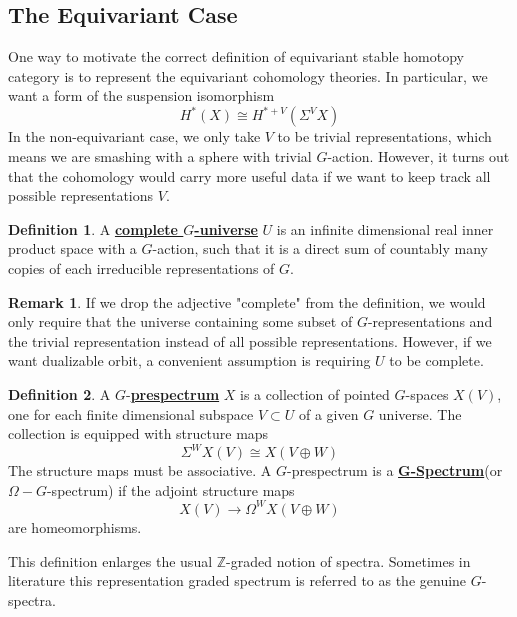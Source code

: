 \documentclass{article}
\theoremstyle{definition}
\theoremstyle{definition}
\newtheorem{definition}{Definition}[theorem]
\theoremstyle{definition}
\newtheorem{remark}{Remark}[theorem]
\theoremstyle{definition}
\theoremstyle{definition}
\theoremstyle{definition}
\theoremstyle{definition}
\begin{document}
\subsection{The Equivariant Case}
One way to motivate the correct definition of equivariant stable homotopy category is to represent the equivariant cohomology theories. In particular, we want a form of the suspension isomorphism
\[H^*(X)\cong H^{*+V}(\Sigma^VX)\]
In the non-equivariant case, we only take $V$ to be trivial representations, which means we are smashing with a sphere with trivial $G$-action. However, it turns out that the cohomology would carry more useful data if we want to keep track all possible representations $V$. 


\begin{tcolorbox}[colback=purple!5!white,colframe=purple!75!black]
\begin{definition}
A \underline{\textbf{complete $G$-universe}} $U$ is an infinite dimensional real inner product space with a $G$-action, such that it is a direct sum of countably many copies of each irreducible representations of $G$. 
\end{definition}
\end{tcolorbox}


\begin{tcolorbox}[colback=green!5!white,colframe=green!30!white]
\begin{remark}
If we drop the adjective "complete" from the definition, we would only require that the universe containing some subset of $G$-representations and the trivial representation instead of all possible representations. However, if we want dualizable orbit, a convenient assumption is requiring $U$ to be complete.  
\end{remark}
\end{tcolorbox}


\begin{tcolorbox}[colback=purple!5!white,colframe=purple!75!black]
\begin{definition}
A $G$-\underline{\textbf{prespectrum}} $X$ is a collection of pointed $G$-spaces $X(V)$, one for each finite dimensional subspace $V\subset U$ of a given $G$ universe. The collection is equipped with structure maps 
\[\Sigma^WX(V)\cong X(V\oplus W)\]
The structure maps must be associative. A $G$-prespectrum is a \underline{\textbf{G-Spectrum}}(or $\Omega-G$-spectrum) if the adjoint structure maps 
\[X(V)\to \Omega^WX(V\oplus W)\] 
are homeomorphisms.
\end{definition}
\end{tcolorbox}
This definition enlarges the usual $\mathbb{Z}$-graded notion of spectra. Sometimes in literature this representation graded spectrum is referred to as the genuine $G$-spectra. 
\end{document}
